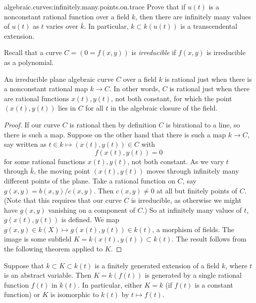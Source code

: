 \begin{problem}{algebraic.curves:infinitely.many.points.on.trace}
Prove that if \(u(t)\) is a nonconstant rational function over a field \(k\), then there are infinitely many values of \(u(t)\) as \(t\) varies over \(\bar{k}\).
In particular, \(k \subset k(u(t))\) is a transcendental extension.
\end{problem}
Recall that a curve \(C=(0=f(x,y))\) is \emph{irreducible}
%
% 
%
if \(f(x,y)\) is irreducible as a polynomial.
\begin{theorem}
An irreducible plane algebraic curve \(C\) over a field \(k\) is rational just when there is a nonconstant rational map \(k \to C\).
In other words, \(C\) is rational just when there are rational functions \(x(t),y(t)\), not both constant, for which the point \((x(t),y(t))\) lies in \(C\) for all \(t\) in the algebraic closure of the field.
\end{theorem}
\begin{proof}
If our curve \(C\) is rational then by definition \(C\) is birational to a line, so there is such a map.
Suppose on the other hand that there is such a map \(k \to C\), say written as \(t \in k \mapsto (x(t),y(t)) \in C\) with
\[
f(x(t),y(t))=0
\]
for some rational functions \(x(t), y(t)\), not both constant.
As we vary \(t\) through \(\bar{k}\), the moving point \((x(t),y(t))\) moves through infinitely many different points of the plane.
Take a rational function on \(C\), say \(g(x,y)=b(x,y)/c(x,y)\).
Then \(c(x,y)\ne 0\) at all but finitely points of \(C\).
(Note that this requires that our curve \(C\) is irreducible, as otherwise we might have \(g(x,y)\) vanishing on a component of \(C\).)
So at infinitely many values of \(t\), \(g(x(t),y(t))\) is defined.
We map \(g(x,y) \in k(X) \mapsto g(x(t),y(t)) \in k(t)\), a morphism of fields. 
The image is some subfield \(K=k(x(t),y(t)) \subset k(t)\).
The result follows from the following theorem applied to \(K\).
\end{proof}
\begin{theorem}
Suppose that \(k \subset K \subset k(t)\) is a finitely generated extension of a field \(k\), where \(t\) is an abstract variable.
Then \(K=k(f(t))\) is generated by a single rational function \(f(t)\) in \(k(t)\).
In particular, either \(K=k\) (if \(f(t)\) is a constant function) or \(K\) is isomorphic to \(k(t)\) by \(t \mapsto f(t)\).
\end{theorem}
